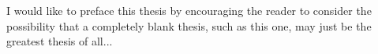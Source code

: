 \beforepreface
{}
I would like to preface this thesis by encouraging the reader to consider the possibility that a completely blank thesis, such as this one, may just be the greatest thesis of all... 
